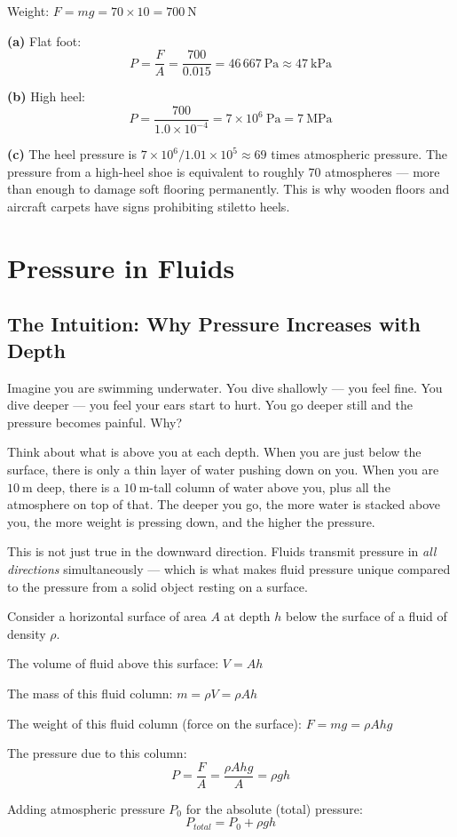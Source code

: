 \begin{solutionbox}
Weight: $F = mg = 70 \times 10 = 700\ \text{N}$

\textbf{(a)} Flat foot:
\[
  P = \frac{F}{A} = \frac{700}{0.015}
  = 46\,667\ \text{Pa} \approx 47\ \text{kPa}
\]

\textbf{(b)} High heel:
\[
  P = \frac{700}{1.0\times10^{-4}}
  = 7\times10^6\ \text{Pa} = 7\ \text{MPa}
\]

\textbf{(c)} The heel pressure is
$7\times10^6 / 1.01\times10^5 \approx 69$ times
atmospheric pressure. The pressure from a high-heel
shoe is equivalent to roughly 70 atmospheres --- more
than enough to damage soft flooring permanently.
This is why wooden floors and aircraft carpets have
signs prohibiting stiletto heels.
\end{solutionbox}

\section{Pressure in Fluids}

\subsection{The Intuition: Why Pressure Increases with Depth}

Imagine you are swimming underwater. You dive
shallowly --- you feel fine. You dive deeper ---
you feel your ears start to hurt. You go deeper
still and the pressure becomes painful. Why?

Think about what is above you at each depth.
When you are just below the surface, there is
only a thin layer of water pushing down on you.
When you are $10\ \text{m}$ deep, there is a
$10\ \text{m}$-tall column of water above you,
plus all the atmosphere on top of that. The
deeper you go, the more water is stacked above
you, the more weight is pressing down, and the
higher the pressure.

This is not just true in the downward direction.
Fluids transmit pressure in \textit{all directions}
simultaneously --- which is what makes fluid
pressure unique compared to the pressure from
a solid object resting on a surface.

\begin{processbox}
Consider a horizontal surface of area $A$ at depth $h$
below the surface of a fluid of density $\rho$.

The volume of fluid above this surface:
$V = Ah$

The mass of this fluid column:
$m = \rho V = \rho A h$

The weight of this fluid column (force on the surface):
$F = mg = \rho A h g$

The pressure due to this column:
\[
  P = \frac{F}{A} = \frac{\rho A h g}{A}
  = \boxed{\rho g h}
\]

Adding atmospheric pressure $P_0$ for the absolute
(total) pressure:
\[
  P_{total} = P_0 + \rho g h
\]
\end{processbox}

